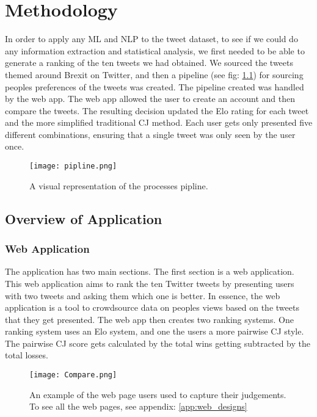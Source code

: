 
\chapter{Methodology}
	\label{chap:typesetting}
	
	In order to apply any ML and NLP to the tweet dataset, to see if we could do any information extraction and statistical analysis, we first needed to be able to generate a ranking of the ten tweets we had obtained. We sourced the tweets themed around Brexit on Twitter, and then a pipeline (see fig: \ref{fig:pipeline}) for sourcing peoples preferences of the tweets was created. The pipeline created was handled by the web app. The web app allowed the user to create an account and then compare the tweets. The resulting decision updated the Elo rating for each tweet and the more simplified traditional CJ method. Each user gets only presented five different combinations, ensuring that a single tweet was only seen by the user once.
	
	\begin{figure}[h]
		\texttt{[image: pipline.png]}
		\caption{A visual representation of the processes pipline.}
		\label{fig:pipeline}
		
	\end{figure}

	\section{Overview of Application}
	
	\subsection{Web Application}
	The application has two main sections. The first section is a web application. This web application aims to rank the ten Twitter tweets by presenting users with two tweets and asking them which one is better. In essence, the web application is a tool to crowdsource data on peoples views based on the tweets that they get presented. The web app then creates two ranking systems. One ranking system uses an Elo system, and one the users a more pairwise CJ style. The pairwise CJ score gets calculated by the total wins getting subtracted by the total losses.
	
	\begin{figure}[h]
		\centering
		\texttt{[image: Compare.png]}
		\caption{An example of the web page users used to capture their judgements. To see all the web pages, see appendix: \ref{app:web_designs}}
		\label{fig:web_app_example}
		
	\end{figure} 

